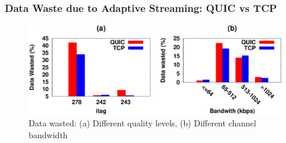\subsubsection{Data Waste due to Adaptive Streaming: QUIC vs TCP}

\begin{figure}[!t]
	\captionsetup[subfigure]{}
	\begin{center}
        \includegraphics[width=0.9\linewidth]{img/plotdata/CDF/downloaded/data_wasted_itag_bw}
		\caption{\label{fig:data_wasted}Data wasted: (a) Different quality levels, (b) Different channel bandwidth}
	\end{center}
\end{figure}



%

